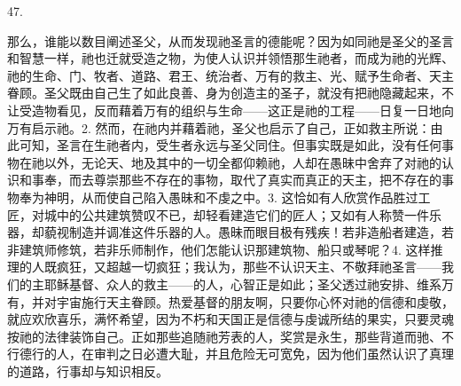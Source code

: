 47. \par

那么，谁能以数目阐述圣父，从而发现祂圣言的德能呢？因为如同祂是圣父的圣言和智慧一样，祂也迁就受造之物，为使人认识并领悟那生祂者，而成为祂的光辉、祂的生命、门、牧者、道路、君王、统治者、万有的救主、光、赋予生命者、天主眷顾。圣父既由自己生了如此良善、身为创造主的圣子，就没有把祂隐藏起来，不让受造物看见，反而藉着万有的组织与生命——这正是祂的工程——日复一日地向万有启示祂。2. 然而，在祂内并藉着祂，圣父也启示了自己，正如救主所说：由此可知，圣言在生祂者内，受生者永远与圣父同住。但事实既是如此，没有任何事物在祂以外，无论天、地及其中的一切全都仰赖祂，人却在愚昧中舍弃了对祂的认识和事奉，而去尊崇那些不存在的事物，取代了真实而真正的天主，把不存在的事物奉为神明，从而使自己陷入愚昧和不虔之中。3. 这恰如有人欣赏作品胜过工匠，对城中的公共建筑赞叹不已，却轻看建造它们的匠人；又如有人称赞一件乐器，却藐视制造并调准这件乐器的人。愚昧而眼目极有残疾！若非造船者建造，若非建筑师修筑，若非乐师制作，他们怎能认识那建筑物、船只或琴呢？4. 这样推理的人既疯狂，又超越一切疯狂；我认为，那些不认识天主、不敬拜祂圣言——我们的主耶稣基督、众人的救主——的人，心智正是如此；圣父透过祂安排、维系万有，并对宇宙施行天主眷顾。热爱基督的朋友啊，只要你心怀对祂的信德和虔敬，就应欢欣喜乐，满怀希望，因为不朽和天国正是信德与虔诚所结的果实，只要灵魂按祂的法律装饰自己。正如那些追随祂芳表的人，奖赏是永生，那些背道而驰、不行德行的人，在审判之日必遭大耻，并且危险无可宽免，因为他们虽然认识了真理的道路，行事却与知识相反。\par

